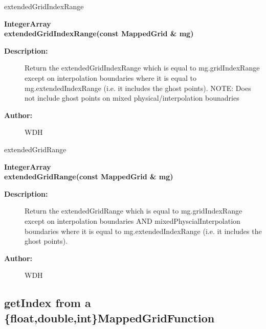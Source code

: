 extendedGridIndexRange
 
\begin{flushleft} \textbf{%
IntegerArray \\ 
\settowidth{\OGgetIndexIncludeArgIndent}{extendedGridIndexRange(}%
extendedGridIndexRange(const MappedGrid \& mg)
}\end{flushleft}
\begin{description}
\item[{\bf Description:}] 
   Return the extendedGridIndexRange which is equal to mg.gridIndexRange except on
  interpolation boundaries where it is equal to mg.extendedIndexRange (i.e. it includes
  the ghost points). NOTE: Does not include ghost points on mixed physical/interpolation bounadries
\item[{\bf Author:}]  WDH
\end{description}
extendedGridRange
 
\begin{flushleft} \textbf{%
IntegerArray \\ 
\settowidth{\OGgetIndexIncludeArgIndent}{extendedGridRange(}%
extendedGridRange(const MappedGrid \& mg)
}\end{flushleft}
\begin{description}
\item[{\bf Description:}] 
   Return the extendedGridRange which is equal to mg.gridIndexRange except on
  interpolation boundaries AND mixedPhyscialInterpolation boundaries
  where it is equal to mg.extendedIndexRange (i.e. it includes
  the ghost points). 
\item[{\bf Author:}]  WDH
\end{description}
\subsection{getIndex from a \{float,double,int\}MappedGridFunction}
 
